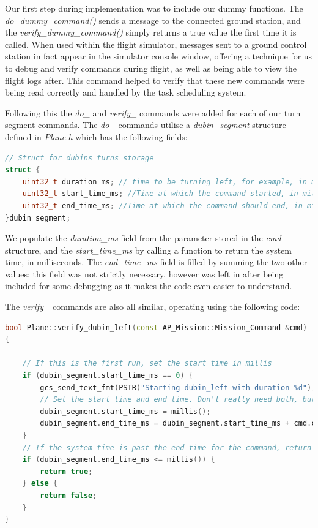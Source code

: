 Our first step during implementation was to include our dummy functions. The \textit{do\_dummy\_command()} sends a message to the connected ground station, and the \textit{verify\_dummy\_command()} simply returns a true value the first time it is called. When used within the flight simulator, messages sent to a ground control station in fact appear in the simulator console window, offering a technique for us to debug and verify commands during flight, as well as being able to view the flight logs after. This command helped to verify that these new commands were being read correctly and handled by the task scheduling system. 

Following this the \textit{do\_} and \textit{verify\_} commands were added for each of our turn segment commands. The \textit{do\_} commands utilise a \textit{dubin\_segment} structure defined in \textit{Plane.h} which has the following fields:

\begin{minipage}{\linewidth}
\begin{lstlisting}[language=C++]
// Struct for dubins turns storage
struct {
    uint32_t duration_ms; // time to be turning left, for example, in milliseconds
    uint32_t start_time_ms; //Time at which the command started, in milliseconds
    uint32_t end_time_ms; //Time at which the command should end, in milliseconds
}dubin_segment;
\end{lstlisting}
\end{minipage}

We populate the \textit{duration\_ms} field from the parameter stored in the \textit{cmd} structure, and the \textit{start\_time\_ms} by calling a function to return the system time, in milliseconds. The \textit{end\_time\_ms} field is filled by summing the two other values; this field was not strictly necessary, however was left in after being included for some debugging as it makes the code even easier to understand. 

The \textit{verify\_} commands are also all similar, operating using the following code:

\begin{minipage}{\linewidth}
\begin{lstlisting}[language=C++]
bool Plane::verify_dubin_left(const AP_Mission::Mission_Command &cmd)
{

    // If this is the first run, set the start time in millis
    if (dubin_segment.start_time_ms == 0) {
        gcs_send_text_fmt(PSTR("Starting dubin_left with duration %d"), dubin_segment.duration_ms);
        // Set the start time and end time. Don't really need both, but using for debugging
        dubin_segment.start_time_ms = millis();
        dubin_segment.end_time_ms = dubin_segment.start_time_ms + cmd.content.dubins.duration_ms;
    }
    // If the system time is past the end time for the command, return true
    if (dubin_segment.end_time_ms <= millis()) {
        return true;
    } else {
        return false;
    }
} 
\end{lstlisting}
\end{minipage}

